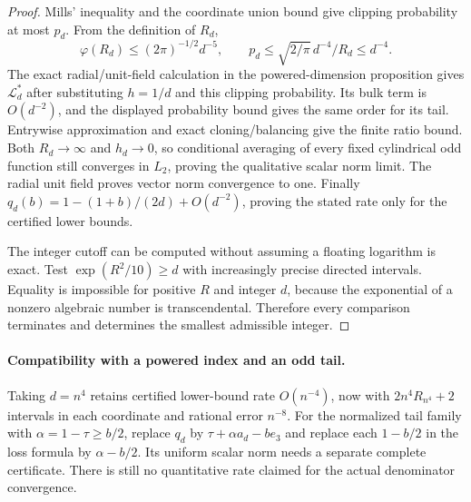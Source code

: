 \documentclass[11pt]{article}
\begin{document}
\begin{proof}
Mills' inequality and the coordinate union bound give clipping
probability at most $p_d$.  From the definition of $R_d$,
\[
 \varphi(R_d)\leq(2\pi)^{-1/2}d^{-5},\qquad
 p_d\leq\sqrt{2/\pi}\,d^{-4}/R_d\leq d^{-4}.
\]
The exact radial/unit-field calculation in the powered-dimension
proposition gives $\mathcal L_d^*$ after substituting $h=1/d$ and
this clipping probability.  Its bulk term is $O(d^{-2})$, and
the displayed probability bound gives the same order for its tail.
Entrywise approximation and exact cloning/balancing give the finite
ratio bound.  Both $R_d\to\infty$ and $h_d\to0$, so conditional
averaging of every fixed cylindrical odd function still converges
in $L_2$, proving the qualitative scalar norm limit.  The radial
unit field proves vector norm convergence to one.
Finally $q_d(b)=1-(1+b)/(2d)+O(d^{-2})$, proving the stated
rate only for the certified lower bounds.

The integer cutoff can be computed without assuming a floating
logarithm is exact.  Test $\exp(R^2/10)\geq d$ with increasingly
precise directed intervals.  Equality is impossible for positive
$R$ and integer $d$, because the exponential of a nonzero algebraic
number is transcendental.  Therefore every comparison terminates
and determines the smallest admissible integer.
\end{proof}

\paragraph{Compatibility with a powered index and an odd tail.}
Taking $d=n^4$ retains certified lower-bound rate $O(n^{-4})$, now
with $2n^4R_{n^4}+2$ intervals in each coordinate and rational error
$n^{-8}$.  For the normalized tail family with
$\alpha=1-\tau\geq b/2$, replace $q_d$ by
$\tau+\alpha a_d-be_3$ and replace each $1-b/2$ in the loss formula
by $\alpha-b/2$.  Its uniform scalar norm needs a separate complete
certificate.  There is still no quantitative rate claimed for the
actual denominator convergence.
\end{document}
